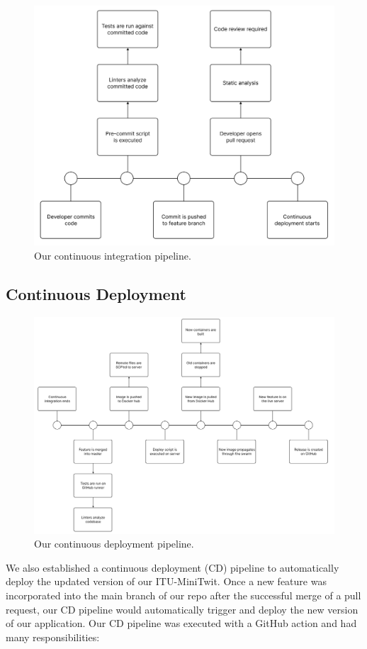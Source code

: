 \documentclass{article}
\begin{document}
\begin{figure}[ht]
    \centering
    \includegraphics[width=1.0\textwidth]{./images/CI_pipeline.png} 
    \caption{Our continuous integration pipeline.}
    \label{fig:Our continuous integration pipeline.}
\end{figure}

\subsection{Continuous Deployment}
\clearpage
\begin{figure}[ht]
    \centering
    \includegraphics[width=1.0\textwidth]{./images/CD_pipeline.png} 
    \caption{Our continuous deployment pipeline.}
    \label{fig:Our continuous deployment pipeline.}
\end{figure}
We also established a continuous deployment (CD) pipeline to automatically deploy the updated version of our ITU-MiniTwit. Once a new feature was incorporated into the main branch of our repo after the successful merge of a pull request, our CD pipeline would automatically trigger and deploy the new version of our application. Our CD pipeline was executed with a GitHub action and had many responsibilities:
\end{document}
